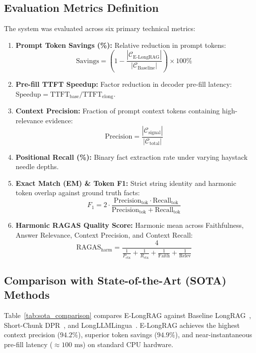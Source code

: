 \documentclass[lettersize,journal]{IEEEtran}
\begin{document}
\subsection{Evaluation Metrics Definition}
The system was evaluated across six primary technical metrics:
\begin{enumerate}
    \item \textbf{Prompt Token Savings (\%):} Relative reduction in prompt tokens:
    \begin{equation}
    \label{eq:savings}
    \text{Savings} = \left( 1 - \frac{|\mathcal{C}_{\text{E-LongRAG}}|}{|\mathcal{C}_{\text{Baseline}}|} \right) \times 100\%
    \end{equation}
    \item \textbf{Pre-fill TTFT Speedup:} Factor reduction in decoder pre-fill latency: $\text{Speedup} = \text{TTFT}_{\text{base}} / \text{TTFT}_{\text{elong}}$.
    \item \textbf{Context Precision:} Fraction of prompt context tokens containing high-relevance evidence:
    \begin{equation}
    \label{eq:precision}
    \text{Precision} = \frac{|\mathcal{C}_{\text{signal}}|}{|\mathcal{C}_{\text{total}}|}
    \end{equation}
    \item \textbf{Positional Recall (\%):} Binary fact extraction rate under varying haystack needle depths.
    \item \textbf{Exact Match (EM) \& Token F1:} Strict string identity and harmonic token overlap against ground truth facts:
    \begin{equation}
    \label{eq:f1}
    F_1 = 2 \cdot \frac{\text{Precision}_{\text{tok}} \cdot \text{Recall}_{\text{tok}}}{\text{Precision}_{\text{tok}} + \text{Recall}_{\text{tok}}}
    \end{equation}
    \item \textbf{Harmonic RAGAS Quality Score:} Harmonic mean across Faithfulness, Answer Relevance, Context Precision, and Context Recall:
    \begin{equation}
    \label{eq:ragas_harm}
    \text{RAGAS}_{\text{harm}} = \frac{4}{\frac{1}{P_{\text{ctx}}} + \frac{1}{R_{\text{ctx}}} + \frac{1}{\text{Faith}} + \frac{1}{\text{Relev}}}
    \end{equation}
\end{enumerate}

\subsection{Comparison with State-of-the-Art (SOTA) Methods}
Table~\ref{tab:sota_comparison} compares E-LongRAG against Baseline LongRAG~\cite{longrag}, Short-Chunk DPR~\cite{sbert}, and LongLLMLingua~\cite{lostinmiddle}. E-LongRAG achieves the highest context precision ($94.2\%$), superior token savings ($94.9\%$), and near-instantaneous pre-fill latency ($\approx 100\text{ ms}$) on standard CPU hardware.
\end{document}
